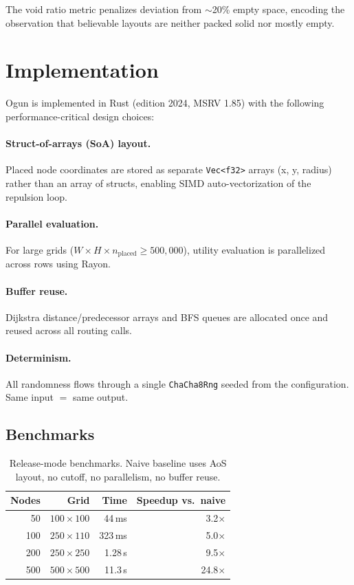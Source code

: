\documentclass[11pt,a4paper]{article}
\begin{document}
The void ratio metric penalizes deviation from $\sim$20\% empty space, encoding
the observation that believable layouts are neither packed solid nor mostly
empty.

\section{Implementation}

Ogun is implemented in Rust (edition 2024, MSRV 1.85) with the following
performance-critical design choices:

\paragraph{Struct-of-arrays (SoA) layout.} Placed node coordinates are stored as separate
\texttt{Vec<f32>} arrays (x, y, radius) rather than an array of structs,
enabling SIMD auto-vectorization of the repulsion loop.

\paragraph{Parallel evaluation.} For large grids ($W \times H \times
n_\text{placed} \geq 500{,}000$), utility evaluation is parallelized across
rows using Rayon.

\paragraph{Buffer reuse.} Dijkstra distance/predecessor arrays and BFS queues
are allocated once and reused across all routing calls.

\paragraph{Determinism.} All randomness flows through a single
\texttt{ChaCha8Rng} seeded from the configuration. Same input $=$ same output.

\subsection{Benchmarks}

\begin{table}[h]
\centering
\begin{tabular}{@{}rrrr@{}}
\toprule
Nodes & Grid & Time & Speedup vs.\ naive \\
\midrule
50 & $100 \times 100$ & 44\,ms & 3.2$\times$ \\
100 & $250 \times 110$ & 323\,ms & 5.0$\times$ \\
200 & $250 \times 250$ & 1.28\,s & 9.5$\times$ \\
500 & $500 \times 500$ & 11.3\,s & 24.8$\times$ \\
\bottomrule
\end{tabular}
\caption{Release-mode benchmarks. Naive baseline uses AoS layout, no cutoff,
no parallelism, no buffer reuse.}
\end{table}
\end{document}
